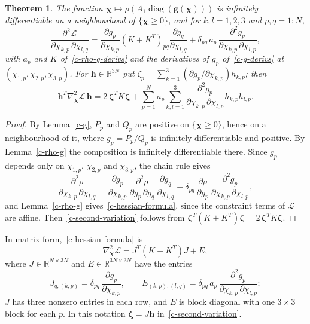 \documentclass[11pt]{article}
\theoremstyle{plain}
\newtheorem{theorem}{Theorem}[section]
\theoremstyle{remark}
\numberwithin{equation}{section}
\begin{document}
\begin{theorem}\label{c-hessian}
The function
$\bm\chi\mapsto\rho\left(A_1\operatorname{diag}\left(\bm g(\bm\chi)\right)\right)$
is infinitely differentiable on a neighbourhood of $\{\bm\chi\ge 0\}$, and for
$k,l=1,2,3$ and $p,q=1:N$,
\begin{equation}\label{c-hessian-formula}
\frac{\partial^2\mathcal{L}}{\partial\chi_{k,p}\,\partial\chi_{l,q}}
=\frac{\partial g_p}{\partial\chi_{k,p}}\left(K+K^T\right)_{pq}
\frac{\partial g_q}{\partial\chi_{l,q}}
+\delta_{pq}\,a_p\,\frac{\partial^2g_p}{\partial\chi_{k,p}\,\partial\chi_{l,p}},
\end{equation}
with $a_p$ and $K$ of~\eqref{c-rho-g-derivs} and the derivatives of $g_p$
of~\eqref{c-g-derivs} at $\left(\chi_{1,p},\chi_{2,p},\chi_{3,p}\right)$.
For $\bm h\in\mathbb{R}^{3N}$ put
$\zeta_p=\sum_{k=1}^3\left(\partial g_p/\partial\chi_{k,p}\right)h_{k,p}$; then
\begin{equation}\label{c-second-variation}
\bm h^T\nabla^2_{\bm\chi}\mathcal{L}\,\bm h
=2\,\bm\zeta^TK\bm\zeta
+\sum_{p=1}^Na_p\sum_{k,l=1}^3\frac{\partial^2g_p}{\partial\chi_{k,p}\,\partial\chi_{l,p}}h_{k,p}h_{l,p}.
\end{equation}
\end{theorem}
\begin{proof}
By Lemma~\ref{c-g}, $P_p$ and $Q_p$ are positive on $\{\bm\chi\ge 0\}$, hence
on a neighbourhood of it, where $g_p=P_p/Q_p$ is infinitely differentiable
and positive. By Lemma~\ref{c-rho-g} the composition is infinitely
differentiable there. Since $g_p$ depends only on $\chi_{1,p}$,
$\chi_{2,p}$ and $\chi_{3,p}$, the chain rule gives
\begin{equation*}
\frac{\partial^2\rho}{\partial\chi_{k,p}\,\partial\chi_{l,q}}
=\frac{\partial g_p}{\partial\chi_{k,p}}\,\frac{\partial^2\rho}{\partial g_p\,\partial g_q}\,
\frac{\partial g_q}{\partial\chi_{l,q}}
+\delta_{pq}\,\frac{\partial\rho}{\partial g_p}\,
\frac{\partial^2g_p}{\partial\chi_{k,p}\,\partial\chi_{l,p}},
\end{equation*}
and Lemma~\ref{c-rho-g} gives~\eqref{c-hessian-formula}, since the
constraint terms of $\mathcal{L}$ are affine.
Then~\eqref{c-second-variation} follows from
$\bm\zeta^T\left(K+K^T\right)\bm\zeta=2\,\bm\zeta^TK\bm\zeta$.
\end{proof}

In matrix form,~\eqref{c-hessian-formula} is
\begin{equation}\label{c-hessian-matrix}
\nabla^2_{\bm\chi}\mathcal{L}=J^T\left(K+K^T\right)J+E,
\end{equation}
where $J\in\mathbb{R}^{N\times 3N}$ and $E\in\mathbb{R}^{3N\times 3N}$ have the
entries
\begin{equation*}
J_{q,(k,p)}=\delta_{pq}\,\frac{\partial g_p}{\partial\chi_{k,p}},\qquad
E_{(k,p),(l,q)}=\delta_{pq}\,a_p\,\frac{\partial^2g_p}{\partial\chi_{k,p}\,\partial\chi_{l,p}};
\end{equation*}
$J$ has three nonzero entries in each row, and $E$ is block diagonal with one
$3\times 3$ block for each $p$. In this notation $\bm\zeta=J\bm h$
in~\eqref{c-second-variation}.
\end{document}

